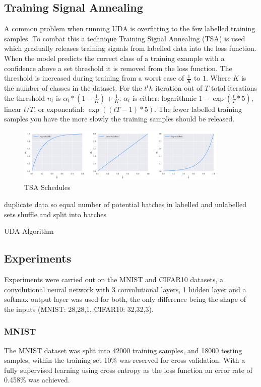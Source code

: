 \documentclass[a4paper]{article}
\begin{document}
\subsection{Training Signal Annealing}
A common problem when running UDA is overfitting to the few labelled training samples. To combat this a technique Training Signal Annealing (TSA) is used which gradually releases training signals from labelled data into the loss function. When the model predicts the correct class of a training example with a confidence above a set threshold it is removed from the loss function. The threshold is increased during training from a worst case of $\frac{1}{K}$ to $1$. Where $K$ is the number of classes in the dataset. For the $t^th$ iteration out of $T$ total iterations the threshold $n_t$ is $\alpha_{t} * (1-\frac{1}{K})+\frac{1}{K}$. $\alpha_t$ is either: logarithmic $1-\exp(\frac{t}{T} * 5)$, linear $t/T$, or exponential: $\exp(({t}{T}-1)*5)$. The fewer labelled training samples you have the more slowly the training samples should be released. 
\begin{figure}[!ht]
  \begin{center}
    \includegraphics[width=0.9\textwidth]{TSA}
    \caption{TSA Schedules}
    \label{fig:objective}
  \end{center}
\end{figure}
\begin{algorithm}[!ht]
\SetAlgoLined
duplicate data so equal number of potential batches in labelled and unlabelled sets\;
shuffle and split into batches\;
\caption{UDA Algorithm}
\label{alg:UDAAlg}
\end{algorithm}

\subsection{Experiments}
Experiments were carried out on the MNIST and CIFAR10 datasets, a convolutional neural network with 3 convolutional layers, 1 hidden layer and a softmax output layer was used for both, the only difference being the shape of the inputs (MNIST: 28,28,1,   CIFAR10: 32,32,3). 
\subsubsection{MNIST}
The MNIST dataset was split into 42000 training samples, and 18000 testing samples, within the training set 10\% was reserved for cross validation. With a fully supervised learning using cross entropy as the loss function an error rate of 0.458\% was achieved. 
\end{document}
